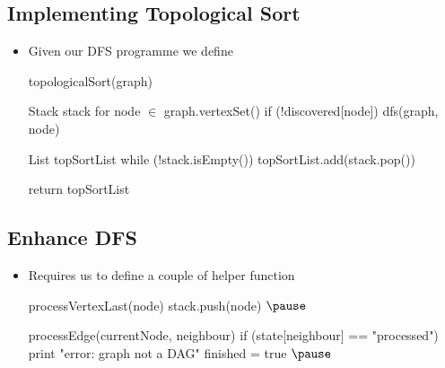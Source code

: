 
\begin{slide}
\section{Implementing Topological Sort}

\begin{PauseHighLight}
  \begin{itemize}
  \item Given our DFS programme we define
    \begin{pseudo}
topologicalSort(graph) {
   Stack stack
   for node $\in$ graph.vertexSet()
      if (!discovered[node])
          dfs(graph, node)
  
   List topSortList
   while (!stack.isEmpty())
      topSortList.add(stack.pop())

   return topSortList
}
    \end{pseudo}
  \end{itemize}
\end{PauseHighLight}

\end{slide}


\begin{slide}
\section{Enhance DFS}

\begin{PauseHighLight}
  \begin{itemize}
  \item Requires us to define a couple of helper function
\begin{pseudo}
  processVertexLast(node) {
     stack.push(node)
  }$\pause$

  processEdge(currentNode, neighbour) {
     if (state[neighbour] == "processed") {
        print "error: graph not a DAG"
        finished = true
     }
  }$\pause$
\end{pseudo}
  \end{itemize}
\end{PauseHighLight}

\end{slide}


